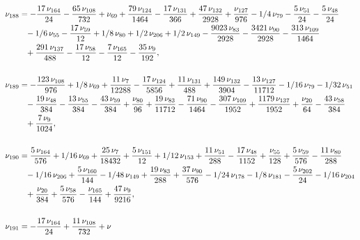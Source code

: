 \documentclass[a4paper,12pt, DIV=14, BCOR=5mm, twoside, headsepline, numbers=noenddot]{scrbook}
\begin{document}
\begin{align}\label{AreaSol17}
\begin{aligned}
\nu_{{188}}&=-{\frac {17\,\nu_{{164}}}{24}}-{\frac {65\,\nu
_{{108}}}{732}}+\nu_{{69}}+{\frac {79\,\nu_{{124}}}{1464}}-{\frac {17
\,\nu_{{131}}}{366}}+{\frac {47\,\nu_{{132}}}{2928}}+{\frac {\nu_{{127
}}}{976}}-1/4\,\nu_{{79}}-{\frac {5\,\nu_{{51}}}{24}}-{\frac {5\,\nu_{
{48}}}{24}}\\
 &\hphantom{=}-1/6\,\nu_{{55}}-{\frac {17\,\nu_{{59}}}{12}}+1/8\,\nu_{{80
}}+1/2\,\nu_{{206}}+1/2\,\nu_{{149}}-{\frac {9023\,\nu_{{83}}}{2928}}-
{\frac {3421\,\nu_{{90}}}{2928}}-{\frac {313\,\nu_{{109}}}{1464}}\\
 &\hphantom{=}+{
\frac {291\,\nu_{{137}}}{488}}-{\frac {17\,\nu_{{58}}}{12}}-{\frac {7
\,\nu_{{165}}}{12}}-{\frac {35\,\nu_{{9}}}{192}}, \\
\\
\nu_{{189}}&=-{\frac {
123\,\nu_{{108}}}{976}}+1/8\,\nu_{{69}}+{\frac {11\,\nu_{{7}}}{12288}}
-{\frac {17\,\nu_{{124}}}{5856}}+{\frac {11\,\nu_{{131}}}{488}}+{
\frac {149\,\nu_{{132}}}{3904}}-{\frac {13\,\nu_{{127}}}{11712}}-1/16
\,\nu_{{79}}-1/32\,\nu_{{51}}\\
 &\hphantom{=}-{\frac {19\,\nu_{{48}}}{384}}-{\frac {13
\,\nu_{{55}}}{384}}-{\frac {43\,\nu_{{59}}}{384}}+{\frac {\nu_{{80}}}{
96}}+{\frac {19\,\nu_{{83}}}{11712}}-{\frac {71\,\nu_{{90}}}{1464}}-{
\frac {307\,\nu_{{109}}}{1952}}+{\frac {1179\,\nu_{{137}}}{1952}}+{
\frac {\nu_{{20}}}{64}}-{\frac {43\,\nu_{{58}}}{384}}\\
 &\hphantom{=}+{\frac {7\,\nu_{
{9}}}{1024}}, \\
\\
\nu_{{190}}&={\frac {5\,\nu_{{164}}}{576}}+1/16\,\nu_{{69}
}+{\frac {25\,\nu_{{7}}}{18432}}+{\frac {5\,\nu_{{151}}}{12}}+1/12\,
\nu_{{153}}+{\frac {11\,\nu_{{51}}}{288}}-{\frac {17\,\nu_{{48}}}{1152
}}+{\frac {\nu_{{55}}}{128}}+{\frac {5\,\nu_{{59}}}{576}}-{\frac {11\,
\nu_{{80}}}{288}}\\
 &\hphantom{=}-1/16\,\nu_{{206}}+{\frac {5\,\nu_{{160}}}{144}}-1/48
\,\nu_{{149}}+{\frac {19\,\nu_{{83}}}{288}}+{\frac {37\,\nu_{{90}}}{
576}}-1/24\,\nu_{{178}}-1/8\,\nu_{{181}}-{\frac {5\,\nu_{{202}}}{24}}-
1/16\,\nu_{{204}}\\
 &\hphantom{=}+{\frac {\nu_{{20}}}{384}}+{\frac {5\,\nu_{{58}}}{576
}}-{\frac {\nu_{{165}}}{144}}+{\frac {47\,\nu_{{9}}}{9216}}, \\
\\
\nu_{{191}
}&=-{\frac {17\,\nu_{{164}}}{24}}+{\frac {11\,\nu_{{108}}}{732}}+\nu_{{
}}
\end{aligned}
\end{align}
\end{document}
